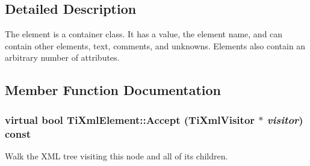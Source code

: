 \subsection{Detailed Description}
The element is a container class. It has a value, the element name, and can contain other elements, text, comments, and unknowns. Elements also contain an arbitrary number of attributes. 

\subsection{Member Function Documentation}
\hypertarget{class_ti_xml_element_a71a81b2afb0d42be1543d1c404dee6f5}{
\subsubsection[{Accept}]{\setlength{\rightskip}{0pt plus 5cm}virtual bool TiXmlElement::Accept ({\bf TiXmlVisitor} $\ast$ {\em visitor}) const}}
\label{class_ti_xml_element_a71a81b2afb0d42be1543d1c404dee6f5}
Walk the XML tree visiting this node and all of its children. 


